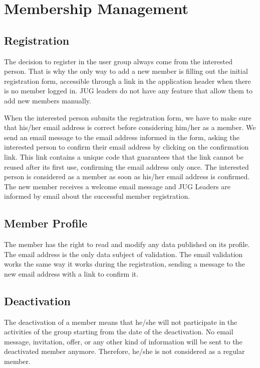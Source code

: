 \documentclass[10pt,a4paper]{report}
\begin{document}
\chapter{Membership Management}

\section{Registration}

The decision to register in the user group always come from the interested person. That is why the only way to add a new member is filling out the initial registration form, accessible through a link in the application header when there is no member logged in. JUG leaders do not have any feature that allow them to add new members manually.

When the interested person submits the registration form, we have to make sure that his/her email address is correct before considering him/her as a member. We send an email message to the email address informed in the form, asking the interested person to confirm their email address by clicking on the confirmation link. This link contains a unique code that guarantees that the link cannot be reused after its first use, confirming the email address only once. The interested person is considered as a member as soon as his/her email address is confirmed. The new member receives a welcome email message and JUG Leaders are informed by email about the successful member registration.

\section{Member Profile}

The member has the right to read and modify any data published on its profile. The email address is the only data subject of validation. The email validation works the same way it works during the registration, sending a message to the new email address with a link to confirm it.

\section{Deactivation}

The deactivation of a member means that he/she will not participate in the activities of the group  starting from the date of the deactivation. No email message, invitation, offer, or any other kind of information will be sent to the deactivated member anymore. Therefore, he/she is not considered as a regular member.
\end{document}

